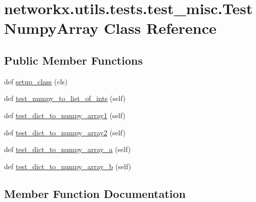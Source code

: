 \hypertarget{classnetworkx_1_1utils_1_1tests_1_1test__misc_1_1TestNumpyArray}{}\section{networkx.\+utils.\+tests.\+test\+\_\+misc.\+Test\+Numpy\+Array Class Reference}
\label{classnetworkx_1_1utils_1_1tests_1_1test__misc_1_1TestNumpyArray}
\subsection*{Public Member Functions}
\begin{DoxyCompactItemize}
\item 
def \hyperlink{classnetworkx_1_1utils_1_1tests_1_1test__misc_1_1TestNumpyArray_a6061b09ae686db3331b32ce650857ab9}{setup\+\_\+class} (cls)
\item 
def \hyperlink{classnetworkx_1_1utils_1_1tests_1_1test__misc_1_1TestNumpyArray_abdf8679e374f940fe97f2a34fe21f9b2}{test\+\_\+numpy\+\_\+to\+\_\+list\+\_\+of\+\_\+ints} (self)
\item 
def \hyperlink{classnetworkx_1_1utils_1_1tests_1_1test__misc_1_1TestNumpyArray_a7b0f2e10e3f25037598e417e56d02876}{test\+\_\+dict\+\_\+to\+\_\+numpy\+\_\+array1} (self)
\item 
def \hyperlink{classnetworkx_1_1utils_1_1tests_1_1test__misc_1_1TestNumpyArray_ab1061225c64fb818bd6798beffdfab28}{test\+\_\+dict\+\_\+to\+\_\+numpy\+\_\+array2} (self)
\item 
def \hyperlink{classnetworkx_1_1utils_1_1tests_1_1test__misc_1_1TestNumpyArray_a197acbcb5f97cbcd799038c647411177}{test\+\_\+dict\+\_\+to\+\_\+numpy\+\_\+array\+\_\+a} (self)
\item 
def \hyperlink{classnetworkx_1_1utils_1_1tests_1_1test__misc_1_1TestNumpyArray_a2da58ec564fc3014165cc9981bf9c676}{test\+\_\+dict\+\_\+to\+\_\+numpy\+\_\+array\+\_\+b} (self)
\end{DoxyCompactItemize}


\subsection{Member Function Documentation}
\mbox{\label{classnetworkx_1_1utils_1_1tests_1_1test__misc_1_1TestNumpyArray_a6061b09ae686db3331b32ce650857ab9}} 
